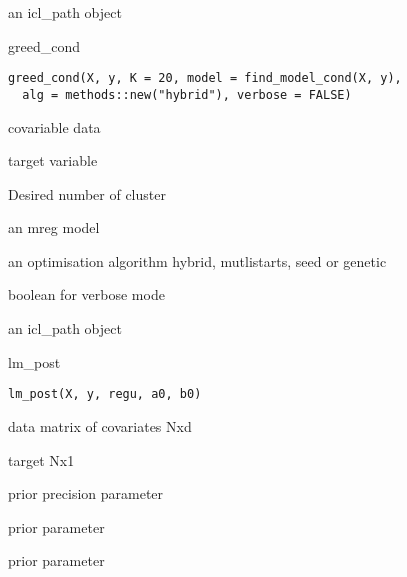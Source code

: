 \documentclass[letterpaper]{book}
\begin{document}
%
\begin{Value}
an icl\_path object
\end{Value}
%
\begin{Description}\relax
greed\_cond
\end{Description}
%
\begin{Usage}
\begin{verbatim}
greed_cond(X, y, K = 20, model = find_model_cond(X, y),
  alg = methods::new("hybrid"), verbose = FALSE)
\end{verbatim}
\end{Usage}
%
\begin{Arguments}
\begin{ldescription}
\item[\code{X}] covariable data

\item[\code{y}] target variable

\item[\code{K}] Desired number of cluster

\item[\code{model}] an mreg model

\item[\code{alg}] an optimisation algorithm hybrid, mutlistarts, seed or genetic

\item[\code{verbose}] boolean for verbose mode
\end{ldescription}
\end{Arguments}
%
\begin{Value}
an icl\_path object
\end{Value}
%
\begin{Description}\relax
lm\_post
\end{Description}
%
\begin{Usage}
\begin{verbatim}
lm_post(X, y, regu, a0, b0)
\end{verbatim}
\end{Usage}
%
\begin{Arguments}
\begin{ldescription}
\item[\code{X}] data matrix of covariates Nxd

\item[\code{y}] target Nx1

\item[\code{regu}] prior precision parameter

\item[\code{a0}] prior parameter

\item[\code{b0}] prior parameter
\end{ldescription}
\end{Arguments}
\end{document}
